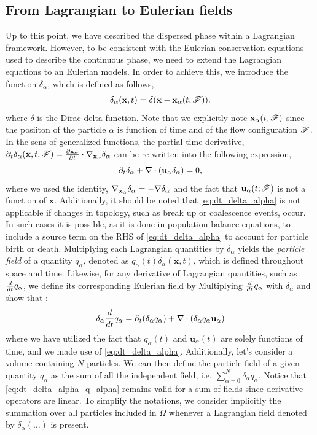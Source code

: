 \subsection{From Lagrangian to Eulerian fields}

Up to this point, we have described the dispersed phase within a Lagrangian framework.
However, to be consistent with the Eulerian conservation equations used to describe the continuous phase, we need to extend the Lagrangian equations to an Eulerian models. 
In order to achieve this, we introduce the function $\delta_\alpha$, which is defined as follows, 
\begin{align}
    \delta_\alpha(\textbf{x},t) = \delta(\textbf{x}-\textbf{x}_\alpha(t,\mathscr{F})).
    \label{eq:delta_alpha}
\end{align}
where $\delta$ is the Dirac delta function.
Note that we explicitly note $\textbf{x}_\alpha(t,\mathscr{F})$ since the posiiton of the particle $\alpha$ is function of time and of the flow configuration $\mathscr{F}$.
In the sens of generalized functions, the partial time derivative, $\partial_t \delta_\alpha(\textbf{x},t,\mathscr{F}) =  \frac{\partial \textbf{x}_\alpha}{\partial t} \cdot \mathbf{\nabla}_{\textbf{x}_\alpha} \delta_\alpha$ can be re-written into the following expression, 
\begin{equation}
    \partial_t \delta_\alpha
    + \mathbf{\nabla}\cdot (\textbf{u}_\alpha  \delta_\alpha)
    =0,
    \label{eq:dt_delta_alpha}
\end{equation}
where we used the identity, $\mathbf{\nabla}_{\textbf{x}_\alpha} \delta_\alpha = -\mathbf{\nabla} \delta_\alpha$ and the fact that $\textbf{u}_\alpha(t;\mathscr{F})$ is not a function of $\textbf{x}$. 
Additionally, it should be noted that \ref{eq:dt_delta_alpha} is not applicable if changes in topology, such as break up or coalescence events, occur.
In such cases it is possible, as it is done in population balance equations, to include a source term on the RHS of \ref{eq:dt_delta_alpha} to account for particle birth or death. 
Multiplying each Lagrangian quantities by $\delta_\alpha$ yields the \textit{particle field} of a quantity $q_\alpha$, denoted as $q_\alpha(t)\delta_\alpha(\textbf{x},t)$, which is defined throughout space and time.
Likewise, for any derivative of Lagrangian quantities, such as $\frac{d}{d t} q_\alpha$, we define its corresponding Eulerian field by Multiplying $\frac{d}{d t} q_\alpha$ with $\delta_\alpha$ and show that :
\begin{equation}
    \delta_\alpha \frac{d}{d t} q_\alpha
    = \partial_t (\delta_\alpha q_\alpha)
    + \mathbf{\nabla}\cdot (\delta_\alpha q_\alpha \textbf{u}_\alpha)
    \label{eq:dt_delta_alpha_q_alpha}
\end{equation}
where we have utilized the fact that $q_\alpha(t)$ and $\textbf{u}_\alpha(t)$ are solely functions of time, and we made use of \ref{eq:dt_delta_alpha}.
Additionally, let's consider a volume containing $N$ particles.
We can then define the particle-field of a given quantity $q_\alpha$ as the sum of all the independent field, i.e. $\sum_{\alpha=0}^N \delta_\alpha q_\alpha$.
Notice that \ref{eq:dt_delta_alpha_q_alpha} remains valid for a sum of fields since derivative operators are linear.
To simplify the notations, we consider implicitly the summation over all particles included in $\Omega$ whenever a Lagrangian field denoted by $\delta_\alpha (\ldots)$ is present.

